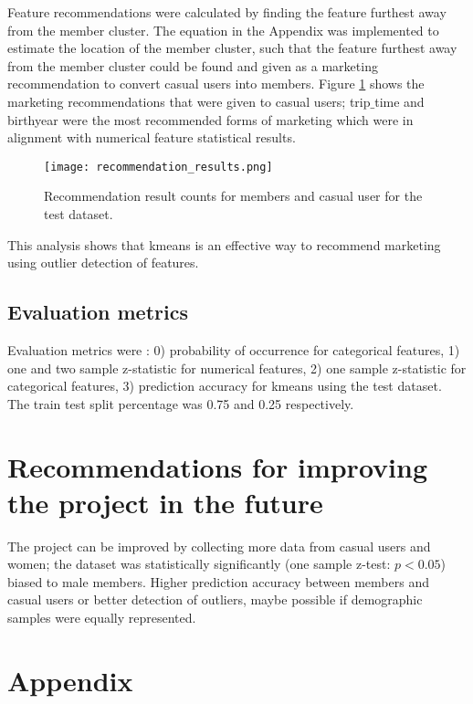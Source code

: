 \documentclass[11pt, onecolumn]{article}
\begin{document}
Feature recommendations were calculated by finding the feature furthest away from the member cluster. The equation in the Appendix was implemented to estimate the location of the member cluster, such that the feature furthest away from the member cluster could be found and given as a marketing recommendation to convert casual users into members. Figure \ref{recommendation_results} shows the marketing recommendations that were given to casual users; trip$\_$time and birthyear were the most recommended forms of marketing which were in alignment with numerical feature statistical results.
\begin{figure}[h]
\begin{center}
\texttt{[image: recommendation\_results.png]}
\end{center}
\caption{Recommendation result counts for members and casual user for the test dataset.}
\label{recommendation_results}
\end{figure}
This analysis shows that kmeans is an effective way to recommend marketing using outlier detection of features.


\subsection{Evaluation metrics}

Evaluation metrics were : 0) probability of occurrence for categorical features, 1) one and two sample z-statistic for numerical features, 2) one sample z-statistic for categorical features, 3) prediction accuracy for kmeans using the test dataset. The train test split percentage was 0.75 and 0.25 respectively.


\section{Recommendations for improving the project in the future}

The project can be improved by collecting more data from casual users and women; the dataset was statistically significantly (one sample z-test: $p < 0.05$) biased to male members. Higher prediction accuracy between members and casual users or better detection of outliers, maybe possible if demographic samples were equally represented.  



\section{Appendix}
\end{document}
